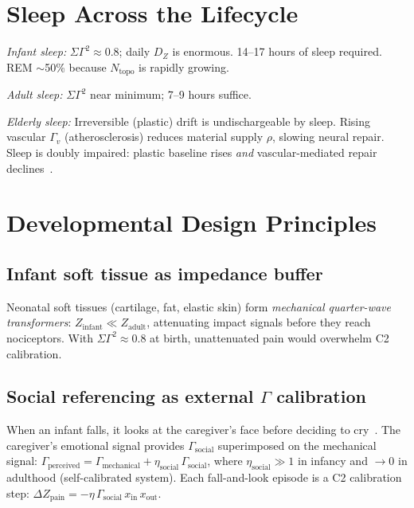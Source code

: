\documentclass[aps,pre,twocolumn,superscriptaddress,floatfix]{revtex4-2}
\begin{document}
\section{Sleep Across the Lifecycle}
\label{sec:sleep-lifecycle}

\emph{Infant sleep:}
$\Sigma\Gamma^2 \approx 0.8$; daily $D_Z$ is enormous.
14--17 hours of sleep required.
REM $\sim$50\% because $N_{\mathrm{topo}}$ is rapidly growing.

\emph{Adult sleep:}
$\Sigma\Gamma^2$ near minimum; 7--9 hours suffice.

\emph{Elderly sleep:}
Irreversible (plastic) drift is undischargeable by sleep.
Rising vascular $\Gamma_v$ (atherosclerosis) reduces
material supply $\rho$, slowing neural repair.
Sleep is doubly impaired: plastic baseline rises
\emph{and} vascular-mediated repair
declines~\cite{Mander2017}.


\section{Developmental Design Principles}
\label{sec:developmental}

\subsection{Infant soft tissue as impedance buffer}

Neonatal soft tissues (cartilage, fat, elastic skin) form
\emph{mechanical quarter-wave transformers}:
$Z_{\text{infant}} \ll Z_{\text{adult}}$,
attenuating impact signals before they reach nociceptors.
With $\Sigma\Gamma^2 \approx 0.8$ at birth,
unattenuated pain would overwhelm C2 calibration.

\subsection{Social referencing as external $\Gamma$ calibration}

When an infant falls, it looks at the caregiver's face
before deciding to cry~\cite{Sorce1985}.
The caregiver's emotional signal provides
$\Gamma_{\mathrm{social}}$ superimposed on the
mechanical signal:
$\Gamma_{\mathrm{perceived}} =
\Gamma_{\mathrm{mechanical}} + \eta_{\mathrm{social}}\,
\Gamma_{\mathrm{social}}$,
where $\eta_{\mathrm{social}} \gg 1$ in infancy
and $\to 0$ in adulthood (self-calibrated system).
Each fall-and-look episode is a C2 calibration step:
$\Delta Z_{\text{pain}} = -\eta\,\Gamma_{\text{social}}\,
x_{\mathrm{in}}\,x_{\mathrm{out}}$.
\end{document}
